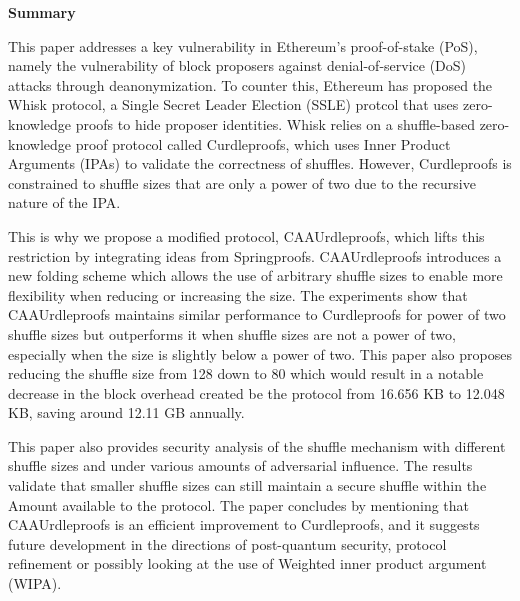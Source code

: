 \onecolumn     %
\thispagestyle{empty}

\begin{center}
    \begin{tcolorbox}[
        width=\dimexpr\paperwidth - 2in\relax,  %
        colback=white,                          %
        colframe=white,                         %
        left=60pt, right=60pt, top=10pt, bottom=10pt, %
        boxrule=0.8pt, %
        fontupper=\large
    ]
        \textbf{\large Summary}%

This paper addresses a key vulnerability in Ethereum’s proof-of-stake (PoS), namely the vulnerability of block proposers against denial-of-service (DoS) attacks through deanonymization.
To counter this, Ethereum has proposed the Whisk protocol, a Single Secret Leader Election (SSLE) protcol that uses zero-knowledge proofs to hide proposer identities.
Whisk relies on a shuffle-based zero-knowledge proof protocol called Curdleproofs, which uses Inner Product Arguments (IPAs) to validate the correctness of shuffles.
However, Curdleproofs is constrained to shuffle sizes that are only a power of two due to the recursive nature of the IPA.


This is why we propose a modified protocol, CAAUrdleproofs, which lifts this restriction by integrating ideas from Springproofs.
CAAUrdleproofs introduces a new folding scheme which allows the use of arbitrary shuffle sizes to enable more flexibility when reducing or increasing the size.
The experiments show that CAAUrdleproofs maintains similar performance to Curdleproofs for power of two shuffle sizes but outperforms it when shuffle sizes are not a power of two, especially when the size is slightly below a power of two.
This paper also proposes reducing the shuffle size from 128 down to 80 which would result in a notable decrease in the block overhead created be the protocol from 16.656 KB to 12.048 KB, saving around 12.11 GB annually.


This paper also provides security analysis of the shuffle mechanism with different shuffle sizes and under various amounts of adversarial influence.
The results validate that smaller shuffle sizes can still maintain a secure shuffle within the Amount available to the protocol.
The paper concludes by mentioning that CAAUrdleproofs is an efficient improvement to Curdleproofs, and it suggests future development in the directions of post-quantum security, protocol refinement or possibly looking at the use of Weighted inner product argument (WIPA).



        \end{tcolorbox}
    \end{center}